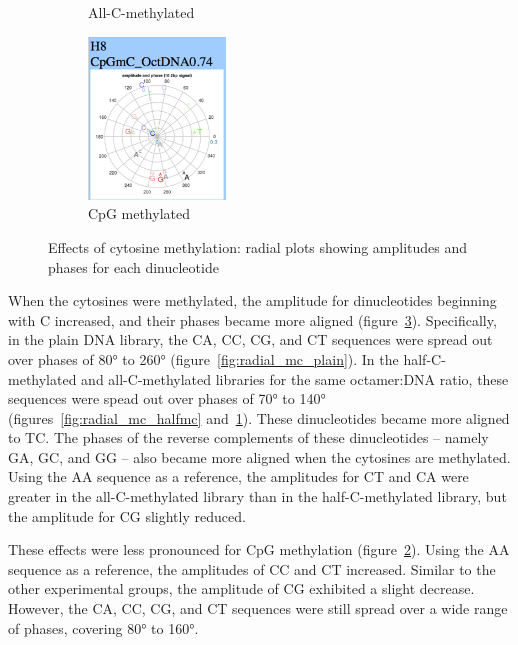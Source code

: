 \documentclass[parskip=full, numbers=noenddot]{scrreprt}
\begin{document}
\begin{figure}[htpb]
\begin{subfigure}[htpb]{0.4\textwidth}
    \caption{All-C-methylated}
    \label{fig:radial_mc_allmc}
  \end{subfigure}
  \begin{subfigure}[htpb]{0.4\textwidth}
    \centering
    \includegraphics[width=0.4\textwidth]{emsa_h8_radial}
    \caption{CpG methylated}
    \label{fig:radial_mc_cpg}
  \end{subfigure}
  \caption{Effects of cytosine methylation: radial plots showing amplitudes and phases for each dinucleotide}
  \label{fig:radial_mc}
\end{figure}


When the cytosines were methylated, the amplitude for dinucleotides beginning with C increased, and their phases became more aligned (figure~\ref{fig:radial_mc}). %
Specifically, in the plain DNA library, the CA, CC, CG, and CT sequences were spread out over phases of \ang{80} to \ang{260} (figure~\ref{fig:radial_mc_plain}).  In the half-C-methylated and all-C-methylated libraries for the same octamer:DNA ratio, these sequences were spead out over phases of \ang{70} to \ang{140} (figures~\ref{fig:radial_mc_halfmc} and~\ref{fig:radial_mc_allmc}).  These dinucleotides became more aligned to TC.  The phases of the reverse complements of these dinucleotides -- namely GA, GC, and GG -- also became more aligned when the cytosines are methylated.   Using the AA sequence as a reference, the amplitudes for CT and CA were greater in the all-C-methylated library than in the half-C-methylated library, but the amplitude for CG slightly reduced.

These effects were less pronounced for CpG methylation (figure~\ref{fig:radial_mc_cpg}). %
Using the AA sequence as a reference, the amplitudes of CC and CT increased.  Similar to the other experimental groups, the amplitude of CG exhibited a slight decrease.  However, the CA, CC, CG, and CT sequences were still spread over a wide range of phases, covering \ang{80} to \ang{160}.
\end{document}
